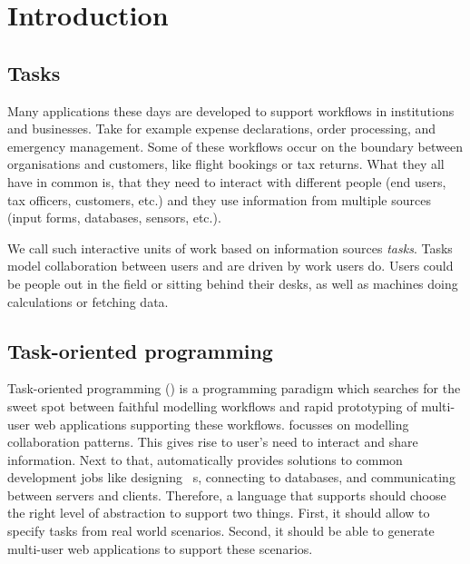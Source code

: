 


\section{Introduction}



\subsection{Tasks}

Many applications these days are developed to support workflows in institutions and businesses.
Take for example expense declarations, order processing, and emergency management.
Some of these workflows occur on the boundary between organisations and customers,
like flight bookings or tax returns.
What they all have in common is,
that they need to interact with different people (end users, tax officers, customers, etc.)
and they use information from multiple sources (input forms, databases, sensors, etc.).

We call such interactive units of work based on information sources \emph{tasks}.
Tasks model collaboration between users and are driven by work users do.
Users could be people out in the field or sitting behind their desks,
as well as machines doing calculations or fetching data.



\subsection{Task-oriented programming}

Task-oriented programming (\TOP) is a programming paradigm which searches for the sweet spot between faithful modelling workflows
and rapid prototyping of multi-user web applications supporting these workflows.
\TOP focusses on modelling collaboration patterns.
This gives rise to user's need to interact and share information.
Next to that, \TOP automatically provides solutions to common development jobs like designing \GUI\ s, connecting to databases, and communicating between servers and clients.
Therefore,
a language that supports \TOP should choose the right level of abstraction to support two things.
First, it should allow to specify tasks from real world scenarios.
Second, it should be able to generate multi-user web applications to support these scenarios.



